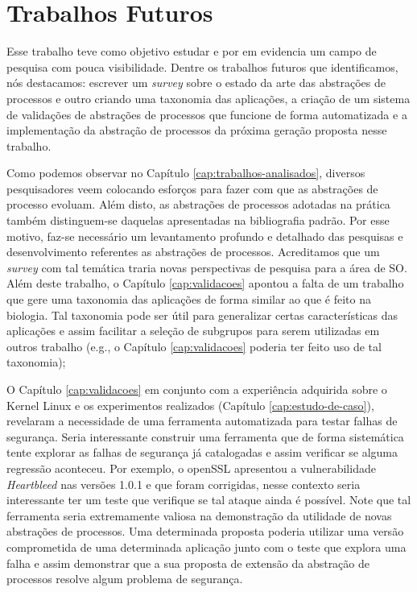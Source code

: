 \section{Trabalhos Futuros}


Esse trabalho teve como objetivo estudar e por em evidencia um campo de
pesquisa com pouca visibilidade. Dentre os trabalhos futuros que identificamos,
nós destacamos: escrever um \textit{survey} sobre o estado da arte das
abstrações de processos e outro criando uma taxonomia das aplicações, a criação
de um sistema de validações de abstrações de processos que funcione de forma
automatizada e a implementação da abstração de processos da próxima geração
proposta nesse trabalho.

Como podemos observar no Capítulo \ref{cap:trabalhos-analisados}, diversos
pesquisadores veem colocando esforços para fazer com que as abstrações de
processo evoluam. Além disto, as abstrações de processos adotadas na prática
também distinguem-se daquelas apresentadas na bibliografia padrão. Por esse
motivo, faz-se necessário um levantamento profundo e detalhado das pesquisas e
desenvolvimento referentes as abstrações de processos. Acreditamos que um
\textit{survey} com tal temática traria novas perspectivas de pesquisa para a
área de SO. Além deste trabalho, o Capítulo \ref{cap:validacoes} apontou a
falta de um trabalho que gere uma taxonomia das aplicações de forma similar ao
que é feito na biologia.  Tal taxonomia pode ser útil para generalizar certas
características das aplicações e assim facilitar a seleção de subgrupos para
serem utilizadas em outros trabalho (e.g., o Capítulo \ref{cap:validacoes}
poderia ter feito uso de tal taxonomia);

O Capítulo \ref{cap:validacoes} em conjunto com a experiência adquirida sobre o
Kernel Linux e os experimentos realizados (Capítulo \ref{cap:estudo-de-caso}),
revelaram a necessidade de uma ferramenta automatizada para testar falhas de
segurança. Seria interessante construir uma ferramenta que de forma sistemática
tente explorar as falhas de segurança já catalogadas e assim verificar se
alguma regressão aconteceu. Por exemplo, o openSSL apresentou a vulnerabilidade
\textit{Heartbleed} nas versões 1.0.1 e que foram corrigidas, nesse contexto
seria interessante ter um teste que verifique se tal ataque ainda é possível.
Note que tal ferramenta seria extremamente valiosa na demonstração da utilidade
de novas abstrações de processos. Uma determinada proposta poderia utilizar uma
versão comprometida de uma determinada aplicação junto com o teste que explora
uma falha e assim demonstrar que a sua proposta de extensão da abstração de
processos resolve algum problema de segurança.

